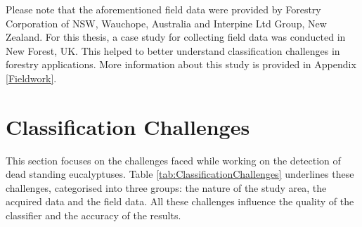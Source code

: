 \documentclass{subfiles}
\begin{document}
\par Please note that the aforementioned field data were provided by Forestry Corporation of NSW, Wauchope, Australia and Interpine Ltd Group, New Zealand. For this thesis, a case study for collecting field data was conducted in New Forest, UK. This helped to better understand classification challenges in forestry applications. More information about this study is provided in Appendix \ref{Fieldwork}.



\section{Classification Challenges}\label{sec:ClassficationChallenges}
\par This section focuses on the challenges faced while working on the detection of dead standing eucalyptuses. Table \ref{tab:ClassificationChallenges} underlines these challenges, categorised into three groups: the nature of the study area, the acquired data and the field data. All these challenges influence the quality of the classifier and the accuracy of the results. 
\end{document}

